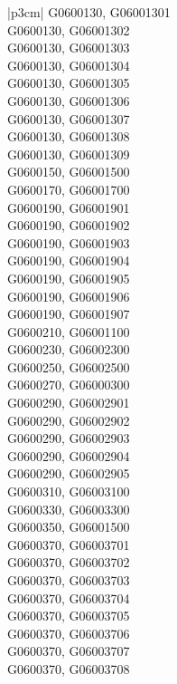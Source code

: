 \begin{customLongTable}{ |p{3cm}| }
G0600130, G06001301 \\ \hline
G0600130, G06001302 \\ \hline
G0600130, G06001303 \\ \hline
G0600130, G06001304 \\ \hline
G0600130, G06001305 \\ \hline
G0600130, G06001306 \\ \hline
G0600130, G06001307 \\ \hline
G0600130, G06001308 \\ \hline
G0600130, G06001309 \\ \hline
G0600150, G06001500 \\ \hline
G0600170, G06001700 \\ \hline
G0600190, G06001901 \\ \hline
G0600190, G06001902 \\ \hline
G0600190, G06001903 \\ \hline
G0600190, G06001904 \\ \hline
G0600190, G06001905 \\ \hline
G0600190, G06001906 \\ \hline
G0600190, G06001907 \\ \hline
G0600210, G06001100 \\ \hline
G0600230, G06002300 \\ \hline
G0600250, G06002500 \\ \hline
G0600270, G06000300 \\ \hline
G0600290, G06002901 \\ \hline
G0600290, G06002902 \\ \hline
G0600290, G06002903 \\ \hline
G0600290, G06002904 \\ \hline
G0600290, G06002905 \\ \hline
G0600310, G06003100 \\ \hline
G0600330, G06003300 \\ \hline
G0600350, G06001500 \\ \hline
G0600370, G06003701 \\ \hline
G0600370, G06003702 \\ \hline
G0600370, G06003703 \\ \hline
G0600370, G06003704 \\ \hline
G0600370, G06003705 \\ \hline
G0600370, G06003706 \\ \hline
G0600370, G06003707 \\ \hline
G0600370, G06003708 \\ \hline

\end{customLongTable}
